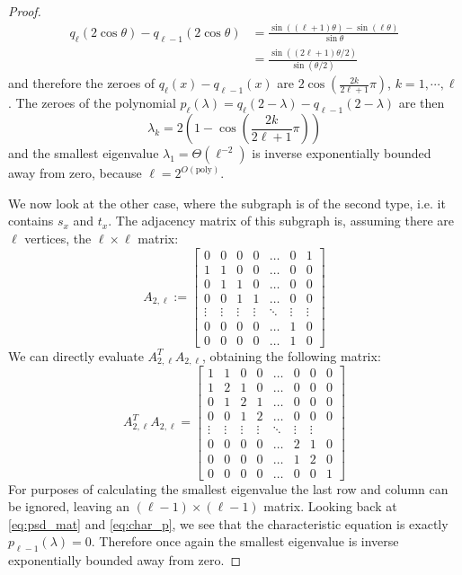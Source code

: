 \documentclass[11pt]{article}
\theoremstyle{definition}
\theoremstyle{remark}
\newcommand{\poly}{\textrm{poly}}
\begin{document}
\begin{proof}
\begin{align}
q_\ell(2\cos\theta) - q_{\ell-1}(2\cos\theta) &= \frac{\sin((\ell+1)\theta) - \sin(\ell \theta)}{\sin\theta} \\
&= \frac{\sin((2\ell+1)\theta/2)}{\sin (\theta/2)}
\end{align}
and therefore the zeroes of $q_\ell(x) - q_{\ell-1}(x)$ are $2\cos\left(\frac{2k}{2\ell + 1}\pi\right)$, $k = 1,\cdots,\ell$. The zeroes of the polynomial $p_\ell(\lambda) = q_\ell(2-\lambda) - q_{\ell-1}(2-\lambda)$ are then
\begin{equation}
\lambda_k = 2\left(1 - \cos\left(\frac{2k}{2\ell+1}\pi\right)\right)
\end{equation}
and the smallest eigenvalue $\lambda_1 = \Theta(\ell^{-2})$ is inverse exponentially bounded away from zero, because $\ell = 2^{O(\poly)}$.

We now look at the other case, where the subgraph is of the second type, i.e. it contains $s_x$ and $t_x$. The adjacency matrix of this subgraph is, assuming there are $\ell$ vertices, the $\ell \times \ell $ matrix:
\begin{equation}
A_{2,\ell} := 
\begin{bmatrix}
    0 & 0 & 0 & 0 & \dots  & 0  & 1 \\
    1 & 1 & 0 & 0 &\dots  & 0 & 0 \\
    0 & 1 & 1 & 0 & \dots  & 0 & 0 \\
     0 & 0 & 1 & 1 & \dots  & 0 & 0 \\
    \vdots & \vdots & \vdots & \vdots & \ddots & \vdots & \vdots \\
    0 & 0 & 0 & 0 & \dots  & 1 & 0 \\
    0 & 0 & 0 & 0 & \dots  & 1 & 0
\end{bmatrix}
\end{equation}
We can directly evaluate $A_{2,\ell}^T A_{2,\ell}$, obtaining the following matrix:
\begin{equation}
A_{2,\ell}^T A_{2,\ell} = 
\begin{bmatrix}
    1 & 1 & 0 & 0 & \dots  & 0 & 0  & 0 \\
    1 & 2 & 1 & 0 &\dots  & 0 & 0 & 0 \\
    0 & 1 & 2 & 1 & \dots  & 0 & 0 & 0 \\
     0 & 0 & 1 & 2 & \dots  & 0 & 0 & 0 \\
    \vdots & \vdots & \vdots & \vdots & \ddots & \vdots & \vdots \\
    0 & 0 & 0 & 0 & \dots  & 2 & 1 & 0 \\
    0 & 0 & 0 & 0 & \dots  & 1 & 2 & 0 \\
    0 & 0 & 0 & 0 & \dots  & 0 & 0 & 1
\end{bmatrix}
\end{equation}
For purposes of calculating the smallest eigenvalue the last row and column can be ignored, leaving an $(\ell-1) \times (\ell-1)$ matrix. Looking back at \ref{eq:psd_mat} and \ref{eq:char_p}, we see that the characteristic equation is exactly $p_{\ell-1}(\lambda) = 0$. Therefore once again the smallest eigenvalue is inverse exponentially bounded away from zero.

\end{proof}
\end{document}
